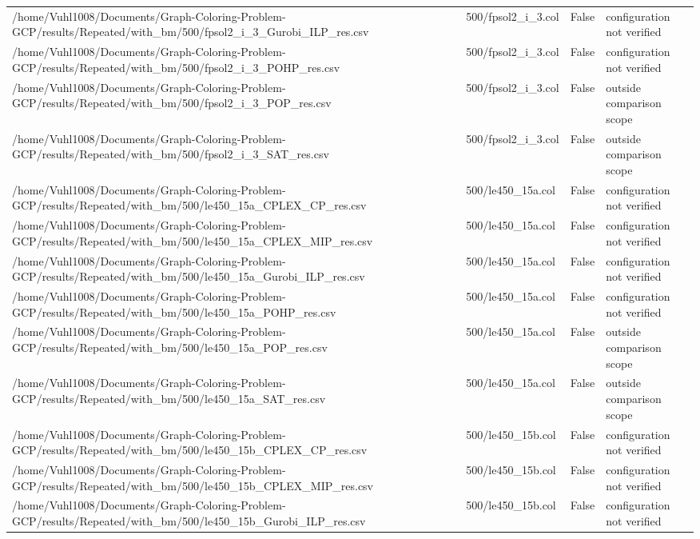 \begin{table}[htbp]
\begin{tabular}{llll}
/home/Vuhl1008/Documents/Graph-Coloring-Problem-GCP/results/Repeated/with\_bm/500/fpsol2\_i\_3\_Gurobi\_ILP\_res.csv & 500/fpsol2\_i\_3.col & False & configuration not verified \\
/home/Vuhl1008/Documents/Graph-Coloring-Problem-GCP/results/Repeated/with\_bm/500/fpsol2\_i\_3\_POHP\_res.csv & 500/fpsol2\_i\_3.col & False & configuration not verified \\
/home/Vuhl1008/Documents/Graph-Coloring-Problem-GCP/results/Repeated/with\_bm/500/fpsol2\_i\_3\_POP\_res.csv & 500/fpsol2\_i\_3.col & False & outside comparison scope \\
/home/Vuhl1008/Documents/Graph-Coloring-Problem-GCP/results/Repeated/with\_bm/500/fpsol2\_i\_3\_SAT\_res.csv & 500/fpsol2\_i\_3.col & False & outside comparison scope \\
/home/Vuhl1008/Documents/Graph-Coloring-Problem-GCP/results/Repeated/with\_bm/500/le450\_15a\_CPLEX\_CP\_res.csv & 500/le450\_15a.col & False & configuration not verified \\
/home/Vuhl1008/Documents/Graph-Coloring-Problem-GCP/results/Repeated/with\_bm/500/le450\_15a\_CPLEX\_MIP\_res.csv & 500/le450\_15a.col & False & configuration not verified \\
/home/Vuhl1008/Documents/Graph-Coloring-Problem-GCP/results/Repeated/with\_bm/500/le450\_15a\_Gurobi\_ILP\_res.csv & 500/le450\_15a.col & False & configuration not verified \\
/home/Vuhl1008/Documents/Graph-Coloring-Problem-GCP/results/Repeated/with\_bm/500/le450\_15a\_POHP\_res.csv & 500/le450\_15a.col & False & configuration not verified \\
/home/Vuhl1008/Documents/Graph-Coloring-Problem-GCP/results/Repeated/with\_bm/500/le450\_15a\_POP\_res.csv & 500/le450\_15a.col & False & outside comparison scope \\
/home/Vuhl1008/Documents/Graph-Coloring-Problem-GCP/results/Repeated/with\_bm/500/le450\_15a\_SAT\_res.csv & 500/le450\_15a.col & False & outside comparison scope \\
/home/Vuhl1008/Documents/Graph-Coloring-Problem-GCP/results/Repeated/with\_bm/500/le450\_15b\_CPLEX\_CP\_res.csv & 500/le450\_15b.col & False & configuration not verified \\
/home/Vuhl1008/Documents/Graph-Coloring-Problem-GCP/results/Repeated/with\_bm/500/le450\_15b\_CPLEX\_MIP\_res.csv & 500/le450\_15b.col & False & configuration not verified \\
/home/Vuhl1008/Documents/Graph-Coloring-Problem-GCP/results/Repeated/with\_bm/500/le450\_15b\_Gurobi\_ILP\_res.csv & 500/le450\_15b.col & False & configuration not verified \\

\end{tabular}
\end{table}
